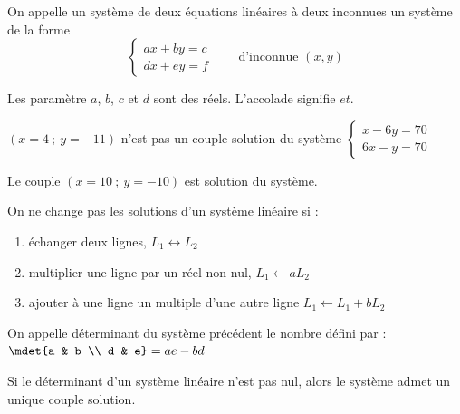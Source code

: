 \documentclass[main.tex]{subfiles}
\begin{document}
\begin{definition} 
	On appelle un système de deux équations linéaires à deux inconnues un système de la forme 
	$$
	\begin{cases}
		ax+by=c\\
		dx+ey=f
	\end{cases} \qquad \text{d'inconnue $(x,y)$}
	$$	
\end{definition}
Les paramètre $a$, $b$, $c$ et $d$ sont des réels.  L'accolade signifie $et$.
\begin{example}   
	$(x=4~;~y=-11)$	n'est pas un couple solution du système $ 
	\begin{cases}
		x-6y=70\\
		6x-y=70
	\end{cases}  
	$ 
	
	Le couple $(x=10~;~y=-10)$ est solution du système. 
	
\end{example} 
\begin{postulat}[admis] On ne change pas les solutions d'un système linéaire si :
	\begin{enumerate}[label=\alph*), leftmargin=*]
		\item échanger deux lignes, $L_1\leftrightarrow L_2$
		\item multiplier une ligne par un réel non nul, $L_1\leftarrow aL_2$
		\item ajouter à une ligne un multiple d'une autre ligne $L_1\leftarrow L_1 + bL_2$
	\end{enumerate} 
\end{postulat}
\begin{definition} 	On appelle déterminant du système précédent le nombre défini par :
	$
	\mdet{a & b \\ d & e} = ae - bd 
	$
\end{definition} 
\begin{theorem} Si le déterminant d'un système linéaire n'est pas nul, alors le système admet un unique couple solution.
\end{theorem}
\end{document}
